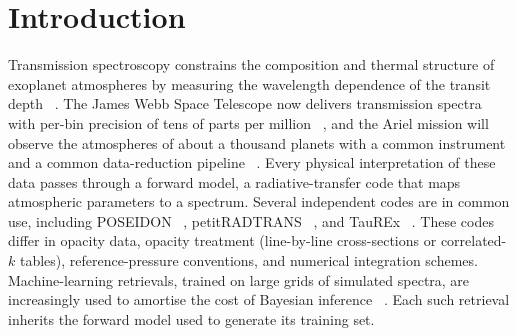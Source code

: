 
\section{Introduction}
\label{sec:intro}

Transmission spectroscopy constrains the composition and thermal structure of exoplanet atmospheres by measuring the wavelength dependence of the transit depth~\cite{TODO_seager_sasselov_2000_transmission}%
.
The James Webb Space Telescope now delivers transmission spectra with per-bin precision of tens of parts per million~\cite{TODO_jwst_ers_transiting_2023}%
, and the Ariel mission will observe the atmospheres of about a thousand planets with a common instrument and a common data-reduction pipeline~\cite{TODO_tinetti_ariel_2018}%
.
Every physical interpretation of these data passes through a forward model, a radiative-transfer code that maps atmospheric parameters to a spectrum.
Several independent codes are in common use, including POSEIDON~\cite{TODO_macdonald_poseidon}%
, petitRADTRANS~\cite{TODO_molliere_petitradtrans}%
, and TauREx~\cite{TODO_alrefaie_taurex3}%
.
These codes differ in opacity data, opacity treatment (line-by-line cross-sections or correlated-$k$ tables), reference-pressure conventions, and numerical integration schemes.
Machine-learning retrievals, trained on large grids of simulated spectra, are increasingly used to amortise the cost of Bayesian inference~\cite{TODO_marquez_neila_2018_hela,TODO_ml_retrieval_review}%
.
Each such retrieval inherits the forward model used to generate its training set.

